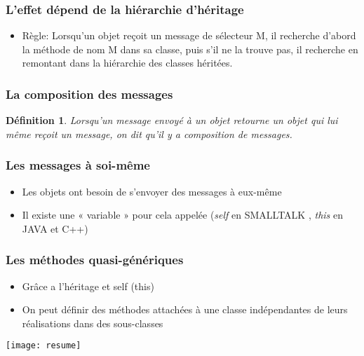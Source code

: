 \documentclass{article}
\newtheorem{definition}{Définition}
\begin{document}
\subsubsection{L'effet dépend de la hiérarchie d'héritage}
\begin{itemize}
	\item Règle: Lorsqu'un objet reçoit un message de sélecteur M, il recherche
d'abord la méthode de nom M dans sa classe, puis s'il ne la
trouve pas, il recherche en remontant dans la hiérarchie des
classes héritées.
\end{itemize}

\subsubsection{La composition des messages}
\begin{definition}
Lorsqu’un message envoyé à un objet retourne un objet qui lui
même reçoit un message, on dit qu’il y a composition de
messages.
\end{definition}

\subsubsection{Les messages à soi-même}
\begin{itemize}
	\item Les objets ont besoin de s'envoyer des messages à
eux-même
	\item  Il existe une « variable » pour cela appelée (\emph{self} en SMALLTALK
		, \emph{this} en JAVA et C++)
\end{itemize}

\subsubsection{Les méthodes quasi-génériques}
\begin{itemize}
	\item Grâce a l'héritage et self (this)
	\item On peut définir des méthodes attachées à une classe
indépendantes de leurs réalisations dans des sous-classes
\end{itemize}

\texttt{[image: resume]}
\centering
\end{document}
